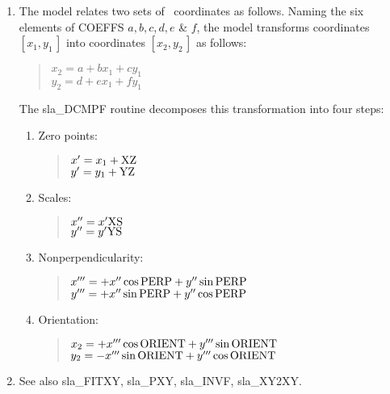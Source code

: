 {
}
{
}
{
  \\
  \\
  \\
  \\
  \\
}
\notes
{
 \begin{enumerate}
  \item The model relates two sets of \xy\ coordinates as follows.
        Naming the six elements of COEFFS $a,b,c,d,e$ \& $f$,
        the model transforms coordinates $[x_{1},y_{1}\,]$ into coordinates
        $[x_{2},y_{2}\,]$ as follows:
        \begin{verse}
         $x_{2} = a + bx_{1} + cy_{1}$ \\
         $y_{2} = d + ex_{1} + fy_{1}$
        \end{verse}
        The sla\_DCMPF routine decomposes this transformation
        into four steps:
        \begin{enumerate}
        \item Zero points:
              \begin{verse}
               $x' = x_{1} + {\rm XZ}$ \\
               $y' = y_{1} + {\rm YZ}$
              \end{verse}
        \item Scales:
              \begin{verse}
               $x'' = x' {\rm XS}$ \\
               $y'' = y' {\rm YS}$
              \end{verse}
        \item Nonperpendicularity:
              \begin{verse}
               $x''' = + x'' \cos {\rm PERP} + y'' \sin {\rm PERP}$ \\
               $y''' = + x'' \sin {\rm PERP} + y'' \cos {\rm PERP}$
              \end{verse}
        \item Orientation:
              \begin{verse}
               $x_{2} = + x''' \cos {\rm ORIENT} +
                          y''' \sin {\rm ORIENT}$ \\
               $y_{2} = - x''' \sin {\rm ORIENT} +
                          y''' \cos {\rm ORIENT}$
              \end{verse}
        \end{enumerate}
  \item See also sla\_FITXY, sla\_PXY, sla\_INVF, sla\_XY2XY.
 \end{enumerate}
}
